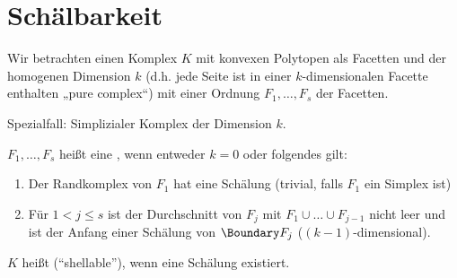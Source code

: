 \chapter{Schälbarkeit}


Wir betrachten einen Komplex $K$ mit konvexen Polytopen als Facetten und der homogenen Dimension $k$ (d.h. jede Seite ist in einer $k$-dimensionalen Facette enthalten „pure complex“) mit einer Ordnung $F_1, \dotsc, F_s$ der Facetten.

Spezialfall: Simplizialer Komplex der Dimension $k$.

$F_1, \dotsc, F_s$ heißt eine , wenn entweder $k=0$ oder folgendes gilt:
\begin{enumerate}[1)]
    \item
        Der Randkomplex von $F_1$ hat eine Schälung (trivial, falls $F_1$ ein Simplex ist)
    \item
        Für $1 < j \le s$ ist der Durchschnitt von $F_j$ mit $F_1 \cup \dotsc \cup F_{j-1}$ nicht leer und ist der Anfang einer Schälung von $\Boundary F_j$ ($(k-1)$-dimensional).
\end{enumerate}
$K$ heißt  (“shellable”), wenn eine Schälung existiert.

